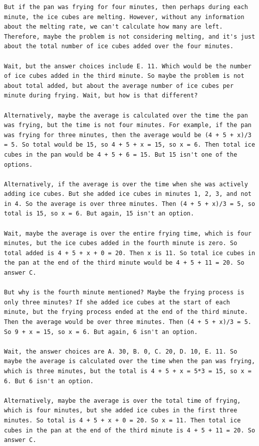 \documentclass{article}
\theoremstyle{plain}
\theoremstyle{definition}
\theoremstyle{remark}
\begin{document}
\begin{lstlisting}
But if the pan was frying for four minutes, then perhaps during each minute, the ice cubes are melting. However, without any information about the melting rate, we can't calculate how many are left. Therefore, maybe the problem is not considering melting, and it's just about the total number of ice cubes added over the four minutes.

Wait, but the answer choices include E. 11. Which would be the number of ice cubes added in the third minute. So maybe the problem is not about total added, but about the average number of ice cubes per minute during frying. Wait, but how is that different?

Alternatively, maybe the average is calculated over the time the pan was frying, but the time is not four minutes. For example, if the pan was frying for three minutes, then the average would be (4 + 5 + x)/3 = 5. So total would be 15, so 4 + 5 + x = 15, so x = 6. Then total ice cubes in the pan would be 4 + 5 + 6 = 15. But 15 isn't one of the options.

Alternatively, if the average is over the time when she was actively adding ice cubes. But she added ice cubes in minutes 1, 2, 3, and not in 4. So the average is over three minutes. Then (4 + 5 + x)/3 = 5, so total is 15, so x = 6. But again, 15 isn't an option.

Wait, maybe the average is over the entire frying time, which is four minutes, but the ice cubes added in the fourth minute is zero. So total added is 4 + 5 + x + 0 = 20. Then x is 11. So total ice cubes in the pan at the end of the third minute would be 4 + 5 + 11 = 20. So answer C.

But why is the fourth minute mentioned? Maybe the frying process is only three minutes? If she added ice cubes at the start of each minute, but the frying process ended at the end of the third minute. Then the average would be over three minutes. Then (4 + 5 + x)/3 = 5. So 9 + x = 15, so x = 6. But again, 6 isn't an option.

Wait, the answer choices are A. 30, B. 0, C. 20, D. 10, E. 11. So maybe the average is calculated over the time when the pan was frying, which is three minutes, but the total is 4 + 5 + x = 5*3 = 15, so x = 6. But 6 isn't an option.

Alternatively, maybe the average is over the total time of frying, which is four minutes, but she added ice cubes in the first three minutes. So total is 4 + 5 + x + 0 = 20. So x = 11. Then total ice cubes in the pan at the end of the third minute is 4 + 5 + 11 = 20. So answer C.


\end{lstlisting}
\end{document}
